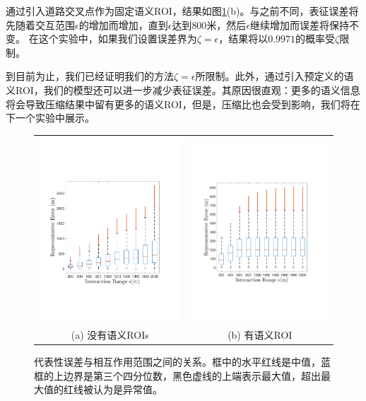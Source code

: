 通过引入道路交叉点作为固定语义ROI，结果如图\ref{fig:relation}(b)。与之前不同，表征误差将先随着交互范围$\epsilon$的增加而增加，直到$\epsilon$达到$800$米，然后$\epsilon$继续增加而误差将保持不变。 在这个实验中，如果我们设置误差界为$ \zeta =\epsilon $，结果将以$ 0.9971 $的概率受$ \zeta $限制。

到目前为止，我们已经证明我们的方法$ \zeta = \epsilon$所限制。此外，通过引入预定义的语义ROI，我们的模型还可以进一步减少表征误差。其原因很直观：更多的语义信息将会导致压缩结果中留有更多的语义ROI，但是，压缩比也会受到影响，我们将在下一个实验中展示。

\tabcolsep=3pt
\begin{figure}[!htb]
\centering
\vspace{-2mm}
\begin{tabular}{cc}
\includegraphics[width=70mm]{pics/relation_without2.pdf}&
\includegraphics[width=68mm]{pics/relation_with2.pdf}\\
(a) 没有语义ROIs & (b) 有语义ROI \\
\end{tabular}
\caption{代表性误差与相互作用范围之间的关系。框中的水平红线是中值，蓝框的上边界是第三个四分位数，黑色虚线的上端表示最大值，超出最大值的红线被认为是异常值。}
\label{fig:relation}
\end{figure}



